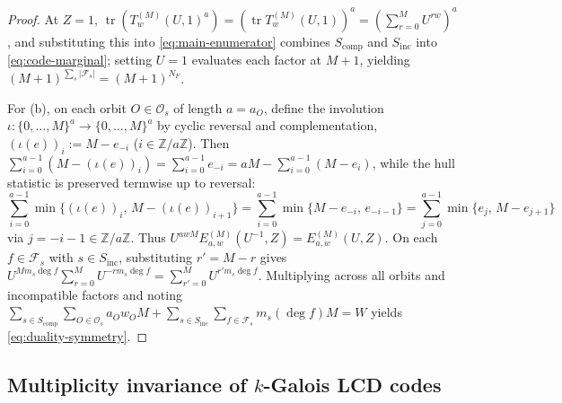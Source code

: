 \documentclass[preprint,12pt]{elsarticle}
\newcommand{\Z}{\mathbb Z}
\newcommand{\Fs}{\mathcal F_s}
\newcommand{\Os}{\mathcal O_s}
\newcommand{\tr}{\operatorname{tr}}
\numberwithin{equation}{section}
\theoremstyle{plain}
\theoremstyle{definition}
\theoremstyle{remark}
\begin{document}
\begin{proof}
At $Z=1$, $\tr(T_w^{(M)}(U,1)^a)=(\tr T_w^{(M)}(U,1))^a=(\sum_{r=0}^{M}U^{rw})^a$,
and substituting this into \eqref{eq:main-enumerator} combines $S_{\mathrm{comp}}$
and $S_{\mathrm{inc}}$ into \eqref{eq:code-marginal}; setting $U=1$ evaluates each
factor at $M+1$, yielding $(M+1)^{\sum_s|\Fs|}=(M+1)^{N_F}$.

For \textup{(b)}, on each orbit $O\in\Os$ of length $a=a_O$, define the involution
$\iota:\{0,\dots,M\}^a\to\{0,\dots,M\}^a$ by cyclic reversal and complementation,
$(\iota(e))_i:=M-e_{-i}$ ($i\in\Z/a\Z$). Then
$\sum_{i=0}^{a-1}(M-(\iota(e))_i)=\sum_{i=0}^{a-1}e_{-i}=aM-\sum_{i=0}^{a-1}(M-e_i)$,
while the hull statistic is preserved termwise up to reversal:
\[
\sum_{i=0}^{a-1}\min\bigl\{(\iota(e))_i,\,M-(\iota(e))_{i+1}\bigr\}
 =\sum_{i=0}^{a-1}\min\{M-e_{-i},\,e_{-i-1}\}
 =\sum_{j=0}^{a-1}\min\{e_j,\,M-e_{j+1}\}
\]
via $j=-i-1\in\Z/a\Z$. Thus $U^{awM}E_{a,w}^{(M)}(U^{-1},Z)=E_{a,w}^{(M)}(U,Z)$.
On each $f\in\Fs$ with $s\in S_{\mathrm{inc}}$, substituting $r'=M-r$ gives
$U^{Mm_s\deg f}\sum_{r=0}^{M}U^{-rm_s\deg f}=\sum_{r'=0}^{M}U^{r'm_s\deg f}$.
Multiplying across all orbits and incompatible factors and noting
$\sum_{s\in S_{\mathrm{comp}}}\sum_{O\in\Os}a_O w_O M
+\sum_{s\in S_{\mathrm{inc}}}\sum_{f\in\Fs}m_s(\deg f)M=W$ yields
\eqref{eq:duality-symmetry}.
\end{proof}

\subsection{Multiplicity invariance of \texorpdfstring{$k$}{k}-Galois LCD codes}\label{sec:lcd}
\end{document}
